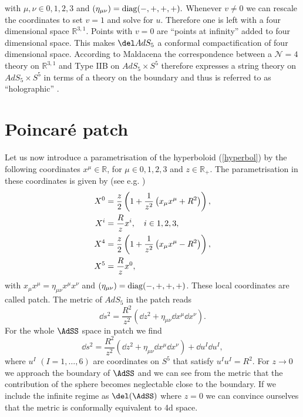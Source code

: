 with $\mu,\nu \in {0,1,2,3}$ and $\left(\eta_{\mu \nu}\right) = {\rm diag}(-,+,+,+).$ Whenever $v \neq 0$ we can rescale the coordinates to set $v = 1$ and solve for $u$. Therefore one is left with a four dimensional  space $\mathbb{R}^{3,1}$. Points with $v=0$ are ``points at infinity'' added to four dimensional  space. This makes $\del AdS_{5}$ a conformal compactification of four dimensional  space. According to Maldacena \cite{maldacena1} the correspondence between a $\mathcal{N}=4$ theory on $\mathbb{R}^{3,1}$ and Type IIB on $AdS_{5}\times S^{5}$ therefore expresses a string theory on $AdS_{5}\times S^{5}$ in terms of a theory on the boundary and thus is referred to as ``holographic'' \cite{Witten:1998qj}.
%
%
\section{Poincaré patch}\label{p_patch}
Let us now introduce a parametrisation of the hyperboloid (\ref{hyperbol}) by the following coordinates $x^{\mu} \in \mathbb{R}$, for $\mu \in {0,1,2,3}$ and $z \in \mathbb{R}_{+}$. The parametrisation in these coordinates is given by (see e.g. \cite{Ammon:2015wua,Bayona:2005nq})
\begin{align}
X^{0} &= \frac{z}{2} \left( 1+ \frac{1}{z^{2}}\left( x_{\mu}x^{\mu} + R^{2}\right) \right), \notag \\
X^{i} &= \frac{R}{z}x^{i},\quad i\in {1,2,3}, \\
X^{4} &= \frac{z}{2} \left( 1 + \frac{1}{z^{2}} \left(x_{\mu}x^{\mu} -R^{2} \right) \right), \notag \\
X^{5} &= \frac{R}{z}x^{0}, \notag
\end{align}
with $x_{\mu}x^{\mu}=\eta_{\mu\nu}x^{\mu}x^{\nu}$ and $\left(\eta_{\mu \nu}\right) = {\rm diag}(-,+,+,+)$. These local coordinates are called  patch. The metric of $AdS_{5}$ in the  patch reads
\begin{equation}
\dd s^{2} = \frac{R^{2}}{z^{2}}\left(\dd z^{2} + \eta_{\mu \nu} \dd x^{\mu} \dd x^{\nu} \right).
\end{equation}
%
%
For the whole $\AdSS$ space in  patch we find
%
%
\begin{equation}
\dd s^{2} = \frac{R^{2}}{z^{2}}\left(\dd z^{2} + \eta_{\mu \nu} \dd x^{\mu} \dd x^{\nu} \right) + \dd u^{I}\dd u^{I},
\end{equation}
%
%
where $u^{I}$ $(I=1,\ldots,6)$ are coordinates on $S^{5}$ that satisfy $u^{I}u^{I}=R^{2}$. For $z\to 0$ we approach the boundary of $\AdSS$ and we can see from the metric that the contribution of the sphere becomes neglectable close to the boundary. If we include the infinite regime as $\del (\AdSS)$ where $z=0$ we can convince ourselves that the metric is conformally equivalent to 4d  space.
%
%
%
%
%
%
